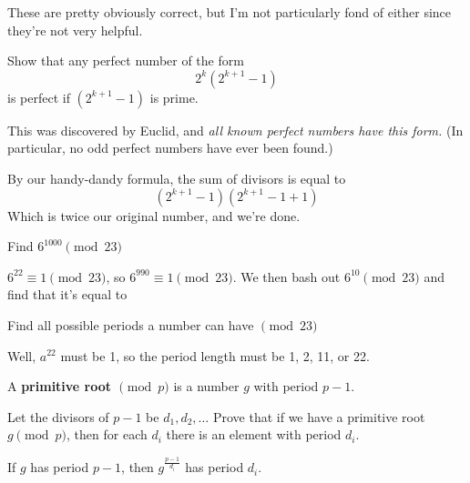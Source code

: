 \documentclass{scrartcl}
\begin{document}
\begin{exercise}
	These are pretty obviously correct, but I'm not particularly fond of either since they're not very helpful.
\end{exercise}

\setcounter{exercise}{14}

\begin{exercise}
	Show that any perfect number of the form
	\[2^k\left(2^{k+1}-1\right)\]
	is perfect if $(2^{k+1} - 1)$ is prime.

	This was discovered by Euclid, and \emph{all known perfect numbers have this form.} (In particular, no odd perfect numbers have ever been found.)
	\begin{soln}
		By our handy-dandy formula,
		the sum of divisors is equal to
		\[(2^{k+1} - 1)(2^{k+1} - 1 + 1)\]
		Which is twice our original number, and we're done.
	\end{soln}
\end{exercise}

\setcounter{exercise}{18}

\begin{exercise}
	Find $6^{1000} \pmod{23}$
	\begin{soln}
		$6^{22} \equiv 1 \pmod{23}$, so $6^{990} \equiv 1 \pmod{23}$. 
		We then bash out $6^{10} \pmod{23}$ and find that it's equal to 
	\end{soln}
\end{exercise}

\begin{exercise}
	Find all possible periods a number can have $\pmod{23}$
	\begin{soln}
		Well, $a^{22}$ must be 1, so the period length must be 1, 2, 11, or 22.
	\end{soln}
\end{exercise}
\begin{definition*}
	A \textbf{primitive root $\pmod{p}$} is a number $g$ with period $p-1$.
\end{definition*}
\begin{exercise}
	Let the divisors of $p-1$ be $d_1, d_2,\dots$ Prove that if we have a primitive root $g \pmod{p}$, then for each $d_i$ there is an element with period $d_i$.
	\begin{soln}
		If $g$ has period $p-1$, then $g^{\frac{p-1}{d_i}}$ has period $d_i$.
	\end{soln}
\end{exercise}

\setcounter{exercise}{23}
\end{document}
